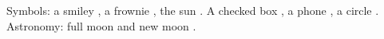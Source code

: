 \documentclass{article}
\begin{document}
Symbols: a smiley \smiley, a frownie \frownie, the sun \sun.
A checked box \checked, a phone \phone, a circle \Circle.
Astronomy: full moon \fullmoon{} and new moon \newmoon.
\end{document}
